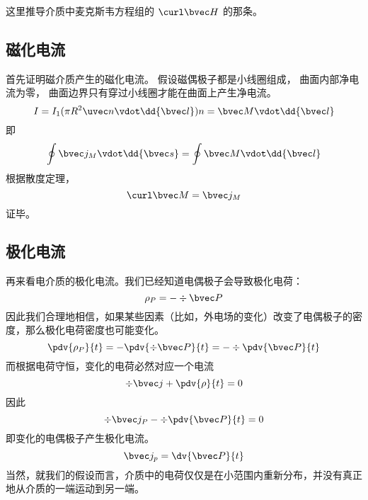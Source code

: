 


这里推导介质中麦克斯韦方程组的 $\curl \bvec H$ 的那条。

\subsection{磁化电流}
首先证明磁介质产生的磁化电流。 假设磁偶极子都是小线圈组成， 曲面内部净电流为零， 曲面边界只有穿过小线圈才能在曲面上产生净电流。
\begin{equation}
I = I_1 (\pi R^2 \uvec n \vdot \dd{\bvec l}) n = \bvec M \vdot \dd{\bvec l}
\end{equation}
即
\begin{equation}
\oint \bvec j_M \vdot \dd{\bvec s} = \oint \bvec M \vdot \dd{\bvec l}
\end{equation}
根据散度定理，
\begin{equation}
\curl \bvec M = \bvec j_M
\end{equation}
证毕。

\subsection{极化电流}
再来看电介质的极化电流。我们已经知道电偶极子会导致极化电荷：
$$\rho_P=-\div \bvec P$$
因此我们合理地相信，如果某些因素（比如，外电场的变化）改变了电偶极子的密度，那么极化电荷密度也可能变化。
$$\pdv{\rho_P}{t}=-\pdv{\div \bvec P}{t}=-\div \pdv{\bvec P}{t}$$
而根据电荷守恒，变化的电荷必然对应一个电流
$$\div \bvec j + \pdv{\rho}{t}=0$$
因此
$$
\div \bvec j_P -\div \pdv{\bvec P}{t}=0
$$
即变化的电偶极子产生极化电流。
\begin{equation}
\bvec j_p = \dv{\bvec P}{t}
\end{equation}
当然，就我们的假设而言，介质中的电荷仅仅是在小范围内重新分布，并没有真正地从介质的一端运动到另一端。

